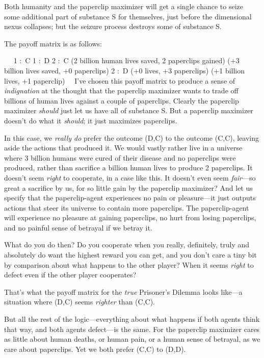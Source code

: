 {
 Both humanity and the paperclip maximizer will get a single chance
to seize some additional part of substance S for themselves, just
before the dimensional nexus collapses; but the seizure process
destroys some of substance S.}

{
 The payoff matrix is as follows:}

{
\ ~ 1 :~C 1 :~D 2 :~C (2 billion human lives saved, 2 paperclips gained)
(+3 billion lives saved, +0 paperclips) 2 :~D (+0 lives, +3 paperclips)
(+1 billion lives, +1 paperclip) \ \ I've chosen this
payoff matrix to produce a sense of \textit{indignation} at the thought
that the paperclip maximizer wants to trade off billions of human lives
against a couple of paperclips. Clearly the paperclip maximizer
\textit{should} just let us have all of substance S. But a paperclip
maximizer doesn't do what it \textit{should}; it just
maximizes paperclips.}

{
 In this case, we \textit{really do} prefer the outcome (D,C) to
the outcome (C,C), leaving aside the actions that produced it. We would
vastly rather live in a universe where 3 billion humans were cured of
their disease and no paperclips were produced, rather than sacrifice a
billion human lives to produce 2 paperclips. It doesn't
seem \textit{right} to cooperate, in a case like this. It
doesn't even seem \textit{fair}{}---so great a
sacrifice by us, for so little gain by the paperclip maximizer? And let
us specify that the paperclip-agent experiences no pain or
pleasure---it just outputs actions that steer its universe to contain
more paperclips. The paperclip-agent will experience no pleasure at
gaining paperclips, no hurt from losing paperclips, and no painful
sense of betrayal if we betray it.}

{
 What do you do then? Do you cooperate when you really, definitely,
truly and absolutely do want the highest reward you can get, and you
don't care a tiny bit by comparison about what happens
to the other player? When it seems \textit{right} to defect even if the
other player cooperates?}

{
 That's what the payoff matrix for the
\textit{true} Prisoner's Dilemma looks like---a
situation where (D,C) seems \textit{righter} than (C,C).}

{
 But all the rest of the logic---everything about what happens if
both agents think that way, and both agents defect---is the same. For
the paperclip maximizer cares as little about human deaths, or human
pain, or a human sense of betrayal, as we care about paperclips. Yet we
both prefer (C,C) to (D,D).}

